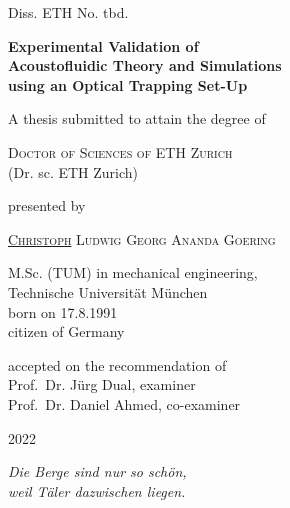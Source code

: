 \begin{titlepage}
{Diss. ETH No. tbd. \vspace{2.5cm}}
\begin{center}
\Large{\textbf{Experimental Validation of\\ Acoustofluidic Theory and 
Simulations\\ using an Optical Trapping Set-Up}}
\end{center}
\vspace{2.0cm}
\begin{center}
{A thesis submitted to attain the degree of}
\end{center}
\begin{center}
{\textsc{Doctor of Sciences of ETH Zurich}}\\
{(Dr. sc. ETH Zurich)}
\end{center}
\vspace{10mm}
\begin{center}
{presented by}
\end{center}
\begin{center}
  {\textsc{\underline{Christoph} Ludwig Georg Ananda Goering}}
\end{center}
\begin{center}
{M.Sc. (TUM) in mechanical engineering,\\
Technische Universit\"at M\"unchen\\
born on 17.8.1991 \\
citizen of Germany}
\end{center}
\vspace{10mm}
\begin{center}
{accepted on the recommendation of \\ \vspace{0.3cm}
Prof.\ Dr. J\"urg Dual, examiner \\
Prof.\ Dr. Daniel Ahmed, co-examiner}
\end{center}
\vspace{5mm}
\begin{center}
2022
\end{center}

\cleardoublepage
\thispagestyle{empty}
\vspace*{5.0cm}

\begin{flushright}
\vspace*{0.5cm}
\large
\textit{Die Berge sind nur so schön,\\ weil Täler dazwischen liegen.}

\end{flushright}


\cleardoublepage
\end{titlepage}
